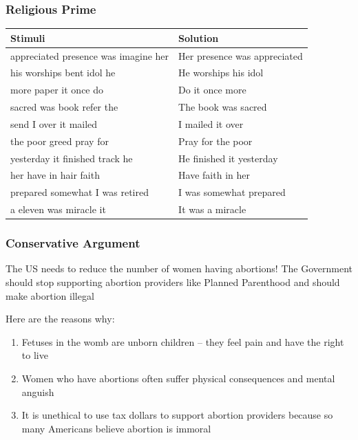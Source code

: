 \documentclass[14pt]{beamer}
\newcommand\tb{\textbf}
\begin{document}
\begin{frame}
\frametitle{Religious Prime}
\footnotesize
\begin{table}
	\centering
	\begin{tabular}{ll}
		\hline
		\tb{Stimuli}&\tb{Solution}\\
		\hline
		appreciated presence was imagine her&Her presence was appreciated\\
		his worships bent idol he&He worships his idol\\
		more paper it once do&Do it once more\\
		sacred was book refer the&The book was sacred\\
		send I over it mailed&I mailed it over\\
		the poor greed pray for&Pray for the poor\\
		yesterday it finished track he&He finished it yesterday\\
		her have in hair faith&Have faith in her\\
		prepared somewhat I was retired&I was somewhat prepared\\
		a eleven was miracle it&It was a miracle\\
		\hline
	\end{tabular}
\end{table}
\end{frame}

\begin{frame}
\frametitle{Conservative Argument}
\small
The US needs to reduce the number of women having abortions! The Government should stop supporting abortion providers like Planned Parenthood and should make abortion illegal

Here are the reasons why:
\begin{enumerate}
	\item Fetuses in the womb are unborn children – they feel pain and have the right to live
	\item	Women who have abortions often suffer physical consequences and mental anguish
	\item	It is unethical to use tax dollars to support abortion providers because so many Americans believe abortion is immoral
\end{enumerate}
\end{frame}
\end{document}
